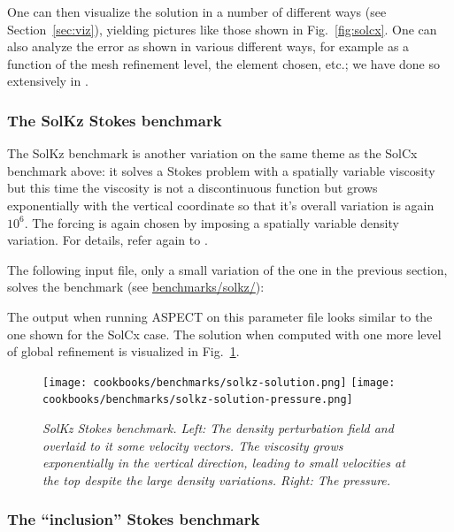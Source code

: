 \documentclass{article}
\newcommand{\aspect}{\textsc{ASPECT}}
\begin{document}
One can then visualize the solution in a number of different ways (see
Section~\ref{sec:viz}), yielding pictures like those shown in
Fig.~\ref{fig:solcx}. One can also analyze the error as shown in various
different ways, for example as a function of the mesh refinement level, the
element chosen, etc.; we have done so extensively in \cite{KHB12}.


\subsubsection{The SolKz Stokes benchmark}
\label{sec:benchmark-solkz}

The SolKz benchmark is another variation on the same theme as the SolCx
benchmark above: it solves a Stokes problem with a spatially variable
viscosity but this time the viscosity is not a discontinuous function but
grows exponentially with the vertical coordinate so that it's overall
variation is again $10^6$. The forcing is again chosen by imposing a spatially
variable density variation. For details, refer again to \cite{DMGT11}.

The following input file, only a small variation of the one in the previous
section, solves the benchmark (see \url{benchmarks/solkz/}):



The output when running \aspect{} on this parameter file looks similar to the
one shown for the SolCx case. The solution when computed with one more level
of global refinement is visualized in Fig.~\ref{fig:solkz}.

\begin{figure}
  \begin{center}
    \texttt{[image: cookbooks/benchmarks/solkz-solution.png]}
    \hfill
    \texttt{[image: cookbooks/benchmarks/solkz-solution-pressure.png]}
    \caption{\it SolKz Stokes benchmark. Left: The density perturbation field
    and overlaid to it some velocity vectors. The viscosity grows exponentially
      in the vertical direction, leading to small velocities at the top
      despite the large density variations. Right: The
      pressure.}
    \label{fig:solkz}
  \end{center}
\end{figure}


\subsubsection{The ``inclusion'' Stokes benchmark}
\label{sec:benchmark-inclusion}
\end{document}
